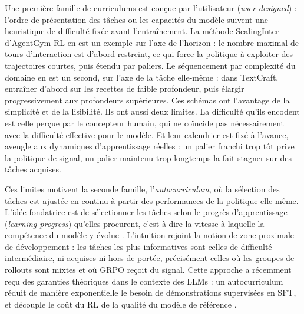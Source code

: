 \documentclass[11pt,a4paper]{article}
\begin{document}
Une première famille de curriculums est conçue par l'utilisateur (\emph{user-designed}) : l'ordre de présentation des tâches ou les capacités du modèle suivent une heuristique de difficulté fixée avant l'entraînement. La méthode ScalingInter d'AgentGym-RL \cite{xi_agentgym-rl_2025} en est un exemple sur l'axe de l'horizon : le nombre maximal de tours d'interaction est d'abord restreint, ce qui force la politique à exploiter des trajectoires courtes, puis étendu par paliers. Le séquencement par complexité du domaine en est un second, sur l'axe de la tâche elle-même : dans TextCraft, entraîner d'abord sur les recettes de faible profondeur, puis élargir progressivement aux profondeurs supérieures. Ces schémas ont l'avantage de la simplicité et de la lisibilité. Ils ont aussi deux limites. La difficulté qu'ils encodent est celle perçue par le concepteur humain, qui ne coïncide pas nécessairement avec la difficulté effective pour le modèle. Et leur calendrier est fixé à l'avance, aveugle aux dynamiques d'apprentissage réelles : un palier franchi trop tôt prive la politique de signal, un palier maintenu trop longtemps la fait stagner sur des tâches acquises.

Ces limites motivent la seconde famille, l'\emph{autocurriculum}, où la sélection des tâches est ajustée en continu à partir des performances de la politique elle-même. L'idée fondatrice est de sélectionner les tâches selon le progrès d'apprentissage (\emph{learning progress}) qu'elles procurent, c'est-à-dire la vitesse à laquelle la compétence du modèle y évolue \cite{graves2017automated}. L'intuition rejoint la notion de zone proximale de développement : les tâches les plus informatives sont celles de difficulté intermédiaire, ni acquises ni hors de portée, précisément celles où les groupes de rollouts sont mixtes et où GRPO reçoit du signal. Cette approche a récemment reçu des garanties théoriques dans le contexte des LLMs : un autocurriculum réduit de manière exponentielle le besoin de démonstrations supervisées en SFT, et découple le coût du RL de la qualité du modèle de référence \cite{rajaraman2026curriculum}.
\end{document}
